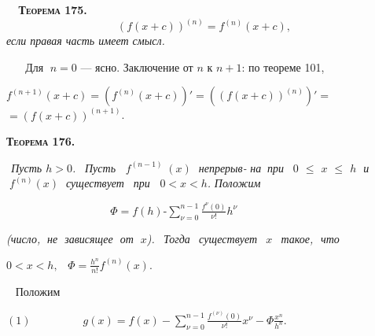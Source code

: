 \footnotesize
\setcounter{page}{141}
\linespread{1}
\normalsize
$\;\;\;\;$\small{\textsf{\textbf{\textsc{Теорема 175.}}}}
\[
(f(x+c))^{(n)}=f^{(n)}(x+c),
\]
\textit{если правая часть имеет смысл.}

$\;\;\;\;$
$\;$Для $\;n=0$ --- ясно. Заключение от
\newline $n$ к $n+1$: по теореме 101,
\begin{center}
${f}^{(n+1)}(x+c)=(f^{(n)}(x+c))'=((f(x+c))^{(n)})'=$
\newline
$=({f}(x+c))^{(n+1)}$.\;\;\;\;\;\;\;\;\;\;\;\;\;\;\;\;\;\;\;
\end{center}
\newline
\begin{left}\;\;\;\;\small{\textsf{\textbf{\textsc{Теорема 176.}}}}\end{left} \textit{$\;\,$Пусть $h>0$.$\;\;\;$Пусть $\;\;f^{(n-1)}\;(x)\;$ непрерыв-}
\newline
\textit{на$\;\;$при$\;\;\;0$ $\leqslant$ $x$ $\leqslant$ $h\;$ и $\;f^{(n)}(x)\;$ существует$\;\;\;$при $\;\;0<x<h$.}
\newline
\textit{Положим}
\newline
\begin{left}
    $\;\;\;\;\;\;\;\;\;\;\;\;\;\;\;\;\;\;\;\;\;\;\;\;\;\;\;\;\;\;\;\;\;\;\Phi=f(h)\text{-}\sum\limits^{n-1}_{\nu=0}\frac{f^{\nu}(0)}{\nu!}h^{\nu}$
\end{left}
\newline
\newline
\textit{(число,$\;$ не$\;$ зависящее$\;$ от $\;x$).$\,\;$ Тогда$\,\;$ существует $\,\;x\;\,$ такое,$\,\,$ что}
\begin{center}
    $
0<x<h,\;\;\;\Phi=\frac{h^n}{n!}f^{(n)}(x).
$
\end{center}
\par{}$\;\;\;$Положим
\begin{center}
$(1)\;\;\;\;\;\;\;\;\;\;\;\;\;\;\;\;\;g(x)=f(x)-\sum\limits_{\nu=0}^{n-1}\frac{f^{(\nu)}(0)}{\nu!}x^\nu-\Phi \frac{x^n}{h^n}.\;\;\;\;\;\;\;\;\;\;\;\;\;\;\;\;\;\;\;\;\;\;\;\;\;\;\;\;\;\;\;\;\;\;\;\;$
\end{center}
